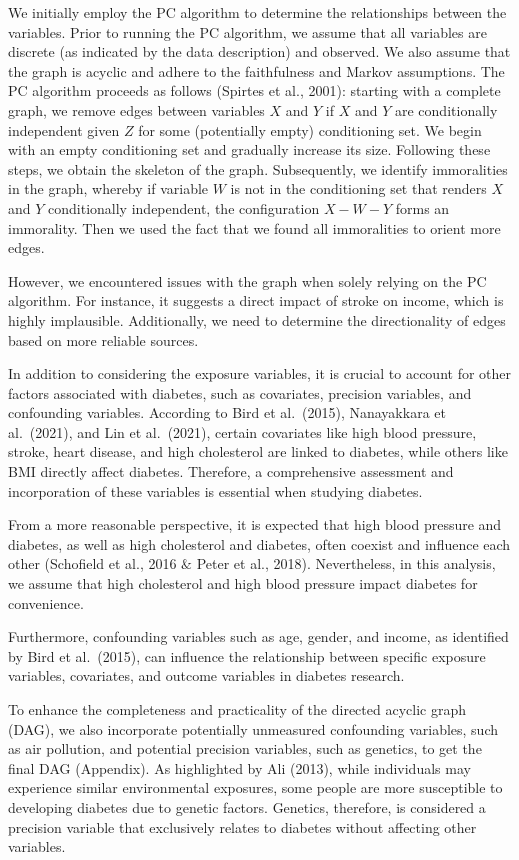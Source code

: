 \documentclass[
  12pt,
]{article}
\begin{document}
We initially employ the PC algorithm to determine the relationships
between the variables. Prior to running the PC algorithm, we assume that
all variables are discrete (as indicated by the data description) and
observed. We also assume that the graph is acyclic and adhere to the
faithfulness and Markov assumptions. The PC algorithm proceeds as
follows (Spirtes et al., 2001): starting with a complete graph, we
remove edges between variables \(X\) and \(Y\) if \(X\) and \(Y\) are
conditionally independent given \(Z\) for some (potentially empty)
conditioning set. We begin with an empty conditioning set and gradually
increase its size. Following these steps, we obtain the skeleton of the
graph. Subsequently, we identify immoralities in the graph, whereby if
variable \(W\) is not in the conditioning set that renders \(X\) and
\(Y\) conditionally independent, the configuration \(X-W-Y\) forms an
immorality. Then we used the fact that we found all immoralities to
orient more edges.

However, we encountered issues with the graph when solely relying on the
PC algorithm. For instance, it suggests a direct impact of stroke on
income, which is highly implausible. Additionally, we need to determine
the directionality of edges based on more reliable sources.

In addition to considering the exposure variables, it is crucial to
account for other factors associated with diabetes, such as covariates,
precision variables, and confounding variables. According to Bird et
al.~(2015), Nanayakkara et al.~(2021), and Lin et al.~(2021), certain
covariates like high blood pressure, stroke, heart disease, and high
cholesterol are linked to diabetes, while others like BMI directly
affect diabetes. Therefore, a comprehensive assessment and incorporation
of these variables is essential when studying diabetes.

From a more reasonable perspective, it is expected that high blood
pressure and diabetes, as well as high cholesterol and diabetes, often
coexist and influence each other (Schofield et al., 2016 \(\&\) Peter et
al., 2018). Nevertheless, in this analysis, we assume that high
cholesterol and high blood pressure impact diabetes for convenience.

Furthermore, confounding variables such as age, gender, and income, as
identified by Bird et al.~(2015), can influence the relationship between
specific exposure variables, covariates, and outcome variables in
diabetes research.

To enhance the completeness and practicality of the directed acyclic
graph (DAG), we also incorporate potentially unmeasured confounding
variables, such as air pollution, and potential precision variables,
such as genetics, to get the final DAG (Appendix). As highlighted by Ali
(2013), while individuals may experience similar environmental
exposures, some people are more susceptible to developing diabetes due
to genetic factors. Genetics, therefore, is considered a precision
variable that exclusively relates to diabetes without affecting other
variables.
\end{document}
